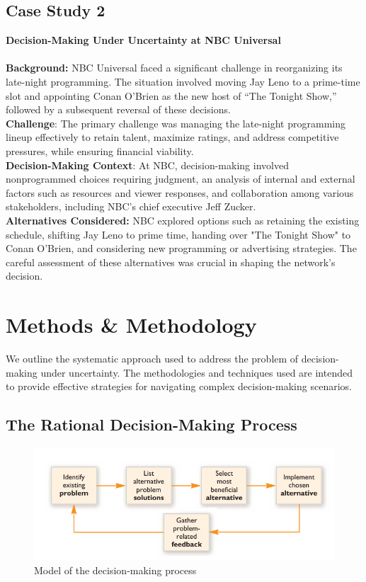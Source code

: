 \documentclass{article}
\begin{document}
\subsection{Case Study 2}
\textbf{Decision-Making Under Uncertainty at NBC Universal}\cite{owczarskireview}
\\
\\
\textbf{Background:} NBC Universal faced a significant challenge in reorganizing its late-night programming. The situation involved moving Jay Leno to a prime-time slot and appointing Conan O'Brien as the new host of “The Tonight Show,” followed by a subsequent reversal of these decisions. 
\\
\textbf{Challenge}:
The primary challenge was managing the late-night programming lineup effectively to retain talent, maximize ratings, and address competitive pressures, while ensuring financial viability.
\\
\textbf{Decision-Making Context}:
At NBC, decision-making involved nonprogrammed choices requiring judgment, an analysis of internal and external factors such as resources and viewer responses, and collaboration among various stakeholders, including NBC's chief executive Jeff Zucker.
\\
\textbf{Alternatives Considered:}
NBC explored options such as retaining the existing schedule, shifting Jay Leno to prime time, handing over "The Tonight Show" to Conan O'Brien, and considering new programming or advertising strategies. The careful assessment of these alternatives was crucial in shaping the network's decision.

\section{Methods \& Methodology}
We outline the systematic approach used to address the problem of decision-making under uncertainty. The methodologies and techniques used are intended to provide effective strategies for navigating complex decision-making scenarios.

\subsection{The Rational Decision-Making Process}
\begin{figure}[h!]
\centering
  \includegraphics[scale=1.0]{Model_of_DM.png}
  \caption{Model of the decision-making process \cite{model_decision_making}}
\end{figure}
\end{document}
